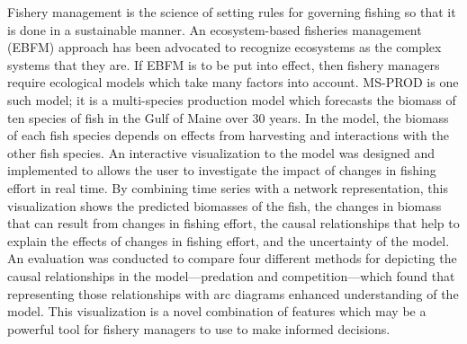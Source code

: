 \begin{abstractpage} 

Fishery management is the science of setting rules for governing fishing so that it is done in a sustainable manner.  An ecosystem-based fisheries management (EBFM) approach has been advocated to recognize ecosystems as the complex systems that they are.  If EBFM is to be put into effect, then fishery managers require ecological models which take many factors into account. MS-PROD is one such model; it is a multi-species production model which forecasts the biomass of ten species of fish in the Gulf of Maine over 30 years.  In the model, the biomass of each fish species depends on effects from harvesting and interactions with the other fish species.  An interactive visualization to the model was designed and implemented to allows the user to investigate the impact of changes in fishing effort in real time.  By combining time series with a network representation, this visualization shows the predicted biomasses of the fish, the changes in biomass that can result from changes in fishing effort, the causal relationships that help to explain the effects of changes in fishing effort, and the uncertainty of the model.  An evaluation was conducted to compare four different methods for depicting the causal relationships in the model---predation and competition---which found that representing those relationships with arc diagrams enhanced understanding of the model.  This visualization is a novel combination of features which may be a powerful tool for fishery managers to use to make informed decisions.

\end{abstractpage}